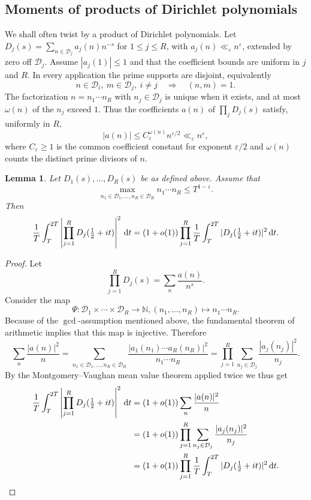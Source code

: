\documentclass[oneside, 12pt]{amsart}
\newtheorem{lem}[thm]{Lemma}
\theoremstyle{definition}
\begin{document}
	\subsection{Moments of products of Dirichlet polynomials} 
	{We shall often twist by a product of Dirichlet polynomials.  Let
		$D_j(s)=\sum_{n\in\mathcal D_j}a_j(n)n^{-s}$ for $1\leq j\leq R$, with
		$a_j(n)\ll_\varepsilon n^\varepsilon$, extended by zero off
		$\mathcal D_j$. Assume $|a_j(1)|\leq1$ and that the coefficient bounds
		are uniform in $j$ and $R$. In every application the prime
		supports are disjoint, equivalently
		\[
		n\in\mathcal D_i,\ m\in\mathcal D_j,\ i\neq j
		\quad\Longrightarrow\quad(n,m)=1.
		\]
		The factorization $n=n_1\cdots n_R$ with $n_j\in\mathcal D_j$ is
		unique when it exists, and at most $\omega(n)$ of the $n_j$ exceed $1$.
		Thus the coefficients $a(n)$ of $\prod_jD_j(s)$ satisfy, uniformly in $R$,
		\[
		|a(n)|\leq C_\varepsilon^{\omega(n)}n^{\varepsilon/2}
		\ll_\varepsilon n^\varepsilon,
		\]
		where $C_\varepsilon\geq1$ is the common coefficient constant for
		exponent $\varepsilon/2$ and $\omega(n)$ counts the distinct prime
		divisors of $n$.}
	
	\begin{lem}\label{splittingDirichletPolynomialsLemma}
		Let $D_1(s),\dots,D_R(s)$ be as defined above. Assume that $$\max_{n_1 \in \mathcal{D}_1, \dots, n_R \in \mathcal{D}_R} n_1\cdots n_R \leq T^{1-\varepsilon}.$$ Then {$$\frac{1}{T}\int_{T}^{2T} \left|\prod_{j=1}^R D_j(\tfrac12+it)\right|^2\, \textup{d}t = (1+o(1))\prod_{j=1}^{R} \frac{1}{T}\int_T^{2T} |D_j(\tfrac12+it)|^2\, \textup{d}t. $$}
	\end{lem}
	
	\begin{proof}
		Let $$\prod_{j=1}^R D_j(s)=\sum_{n} \frac{a(n)}{n^s}.$$ Consider the map $$\Psi: \mathcal{D}_1\times \cdots \times \mathcal{D}_R \to \mathbb{N}, (n_1,\dots,n_R)\mapsto n_1\cdots n_R.$$ Because of the $\gcd$-assumption mentioned above, the fundamental theorem of arithmetic implies that this map is injective. Therefore {$$\sum_{n} \frac{|a(n)|^2}{n} = \sum_{n_1 \in \mathcal{D}_1,\dots ,n_R \in \mathcal{D}_R} \frac{|a_1(n_1)\cdots a_R(n_R)|^2}{n_1\cdots n_R} = \prod_{j=1}^R \sum_{n_j\in \mathcal D_j} \frac{|a_j(n_j)|^2}{n_j}.$$} By the Montgomery--Vaughan mean value theorem applied twice we thus get
		\begin{align*}
			\frac{1}{T}\int_{T}^{2T} \left|\prod_{j=1}^R D_j(\tfrac12+it)\right|^2\, \textup{d}t &= (1+o(1)) \sum_{n} \frac{|a(n)|^2}{n} \\
			&= (1+o(1))\prod_{j=1}^{R} \sum_{n_j \in \mathcal{D}_j} \frac{|a_j(n_j)|^2}{n_j} \\
			&= (1+o(1))\prod_{j=1}^R \frac{1}{T} \int_T^{2T} |D_j(\tfrac12+it)|^2\,\textup{d}t.
		\end{align*}
	\end{proof}
	
\end{document}
